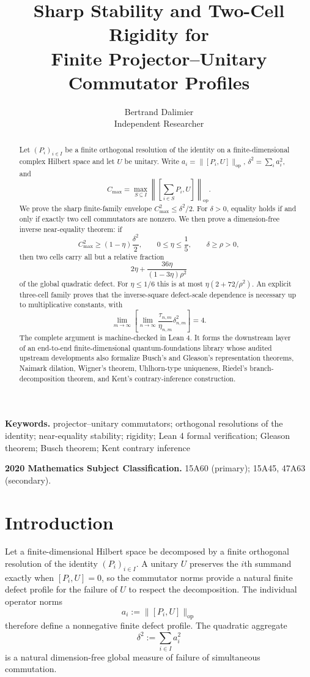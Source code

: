 \documentclass[11pt]{article}
\title{Sharp Stability and Two-Cell Rigidity for\\
Finite Projector--Unitary Commutator Profiles}
\author{Bertrand Dalimier\\
Independent Researcher}
\date{}
\newcommand{\op}{\mathrm{op}}
\newcommand{\cmax}{C_{\max}}
\newcommand{\dd}{\delta}
\newcommand{\etaq}{\eta}
\newcommand{\tauq}{\tau}
\begin{document}
\maketitle

\begin{abstract}
Let $(P_i)_{i\in I}$ be a finite orthogonal resolution of the identity on a
finite-dimensional complex Hilbert space and let $U$ be unitary.  Write
$a_i=\|[P_i,U]\|_{\op}$,
$\dd^2=\sum_i a_i^2$, and
\[
  \cmax=\max_{S\subseteq I}
  \left\|\left[\sum_{i\in S}P_i,U\right]\right\|_{\op}.
\]
We prove the sharp finite-family envelope
$\cmax^2\le\dd^2/2$.  For $\dd>0$, equality holds if and only if exactly two
cell commutators are nonzero.  We then prove a dimension-free inverse
near-equality theorem: if
\[
  \cmax^2\ge(1-\etaq)\frac{\dd^2}{2},
  \qquad
  0\le\etaq\le\frac15,
  \qquad
  \dd\ge\rho>0,
\]
then two cells carry all but a relative fraction
\[
  2\etaq+\frac{36\etaq}{(1-3\etaq)\rho^2}
\]
of the global quadratic defect.  For $\etaq\le1/6$ this is at most
$\etaq(2+72/\rho^2)$.  An explicit three-cell family proves that the
inverse-square defect-scale dependence is necessary up to multiplicative
constants, with
\[
  \lim_{m\to\infty}\left[
    \lim_{n\to\infty}
    \frac{\tauq_{n,m}}{\etaq_{n,m}}\dd_{n,m}^2
  \right]=4.
\]
The complete argument is machine-checked in Lean 4.  It forms the downstream
layer of an end-to-end finite-dimensional quantum-foundations library whose
audited upstream developments also formalize Busch's and Gleason's
representation theorems, Naimark dilation, Wigner's theorem, Uhlhorn-type
uniqueness, Riedel's branch-decomposition theorem, and Kent's
contrary-inference construction.
\end{abstract}

\noindent\textbf{Keywords.}
projector--unitary commutators; orthogonal resolutions of the identity;
near-equality stability; rigidity; Lean 4 formal verification;
Gleason theorem; Busch theorem; Kent contrary inference

\noindent\textbf{2020 Mathematics Subject Classification.}
15A60 (primary); 15A45, 47A63 (secondary).

\section{Introduction}

Let a finite-dimensional Hilbert space be decomposed by a finite orthogonal
resolution of the identity $(P_i)_{i\in I}$.  A unitary $U$ preserves the
$i$th summand exactly when $[P_i,U]=0$, so the commutator norms provide a
natural finite defect profile for the failure of $U$ to respect the
decomposition.  The individual operator norms
\[
  a_i:=\|[P_i,U]\|_{\op}
\]
therefore define a nonnegative finite defect profile.  The quadratic aggregate
\[
  \dd^2:=\sum_{i\in I} a_i^2
\]
is a natural dimension-free global measure of failure of simultaneous
commutation.
\end{document}
